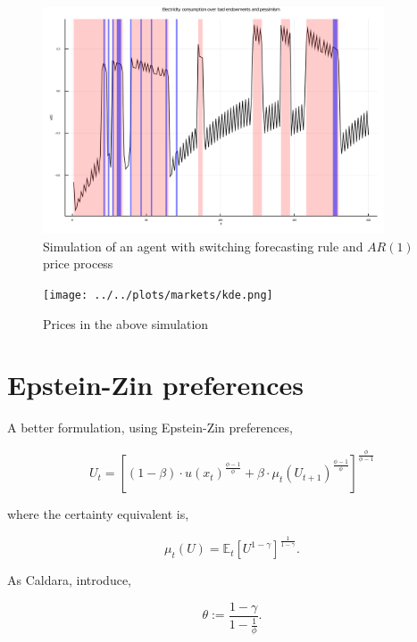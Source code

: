 \documentclass[american]{scrartcl}
\newcommand{\E}{\mathbb{E}}
\begin{document}
\begin{figure}[!ht]
	\centering
	\includegraphics[width=0.9\textwidth]{../../plots/markets/simul.png}
	\caption{Simulation of an agent with switching forecasting rule and $AR(1)$ price process}
	\label{fig:sim}
\end{figure}

\begin{figure}[!ht]
	\centering
	\texttt{[image: ../../plots/markets/kde.png]}
	\caption{Prices in the above simulation}
	\label{fig:price}
\end{figure}


\newpage
\appendix

\section{Epstein-Zin preferences}


A better formulation, using Epstein-Zin preferences,

\begin{equation}
	U_t = \left[ (1 - \beta) \cdot u(x_t)^{\frac{\phi - 1}{\phi}} + \beta \cdot \mu_t(U_{t+1})^{\frac{\phi - 1}{\phi}} \right]^{\frac{\phi}{\phi - 1}}
\end{equation}

where the certainty equivalent is,

\begin{equation}
	\mu_t(U) = \E_t\left[ U^{1 - \gamma} \right]^{\frac{1}{1 - \gamma}}.
\end{equation}

As Caldara, introduce,

\begin{equation}
	\theta := \frac{1 - \gamma}{1 - \frac{1}{\phi}}.
\end{equation}
\end{document}
